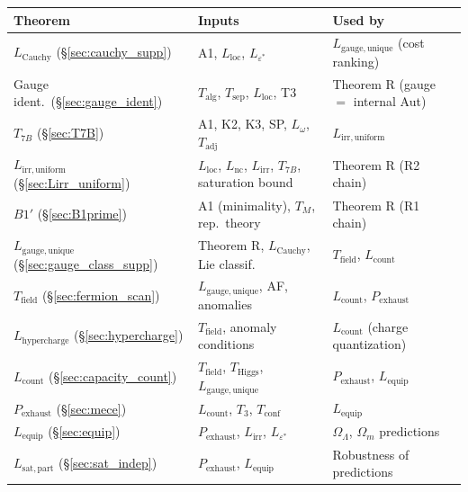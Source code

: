 \documentclass[11pt,a4paper]{article}
\theoremstyle{definition}
\newcommand{\eps}{\varepsilon}
\begin{document}
\smallskip
\begin{center}\footnotesize
\renewcommand{\arraystretch}{1.15}
\begin{tabular}{@{}lp{4.5cm}p{4.5cm}@{}}
\toprule
\textbf{Theorem} & \textbf{Inputs} & \textbf{Used by} \\
\midrule
$L_{\mathrm{Cauchy}}$ (\S\ref{sec:cauchy_supp}) & A1, $L_{\mathrm{loc}}$, $L_{\eps^*}$ & $L_{\mathrm{gauge,unique}}$ (cost ranking) \\
Gauge ident.\ (\S\ref{sec:gauge_ident}) & $T_{\mathrm{alg}}$, $T_{\mathrm{sep}}$, $L_{\mathrm{loc}}$, T3 & Theorem R (gauge $=$ internal Aut) \\
$T_{7B}$ (\S\ref{sec:T7B}) & A1, K2, K3, SP, $L_\omega$, $T_{\mathrm{adj}}$ & $L_{\mathrm{irr,uniform}}$ \\
$L_{\mathrm{irr,uniform}}$ (\S\ref{sec:Lirr_uniform}) & $L_{\mathrm{loc}}$, $L_{\mathrm{nc}}$, $L_{\mathrm{irr}}$, $T_{7B}$, saturation bound & Theorem R (R2 chain) \\
$B1'$ (\S\ref{sec:B1prime}) & A1 (minimality), $T_M$, rep.\ theory & Theorem R (R1 chain) \\
$L_{\mathrm{gauge,unique}}$ (\S\ref{sec:gauge_class_supp}) & Theorem R, $L_{\mathrm{Cauchy}}$, Lie classif. & $T_{\mathrm{field}}$, $L_{\mathrm{count}}$ \\
$T_{\mathrm{field}}$ (\S\ref{sec:fermion_scan}) & $L_{\mathrm{gauge,unique}}$, AF, anomalies & $L_{\mathrm{count}}$, $P_{\mathrm{exhaust}}$ \\
$L_{\mathrm{hypercharge}}$ (\S\ref{sec:hypercharge}) & $T_{\mathrm{field}}$, anomaly conditions & $L_{\mathrm{count}}$ (charge quantization) \\
$L_{\mathrm{count}}$ (\S\ref{sec:capacity_count}) & $T_{\mathrm{field}}$, $T_{\mathrm{Higgs}}$, $L_{\mathrm{gauge,unique}}$ & $P_{\mathrm{exhaust}}$, $L_{\mathrm{equip}}$ \\
$P_{\mathrm{exhaust}}$ (\S\ref{sec:mece}) & $L_{\mathrm{count}}$, $T_3$, $T_{\mathrm{conf}}$ & $L_{\mathrm{equip}}$ \\
$L_{\mathrm{equip}}$ (\S\ref{sec:equip}) & $P_{\mathrm{exhaust}}$, $L_{\mathrm{irr}}$, $L_{\eps^*}$ & $\Omega_\Lambda$, $\Omega_m$ predictions \\
$L_{\mathrm{sat,part}}$ (\S\ref{sec:sat_indep}) & $P_{\mathrm{exhaust}}$, $L_{\mathrm{equip}}$ & Robustness of predictions \\
\bottomrule
\end{tabular}
\end{center}
\end{document}
